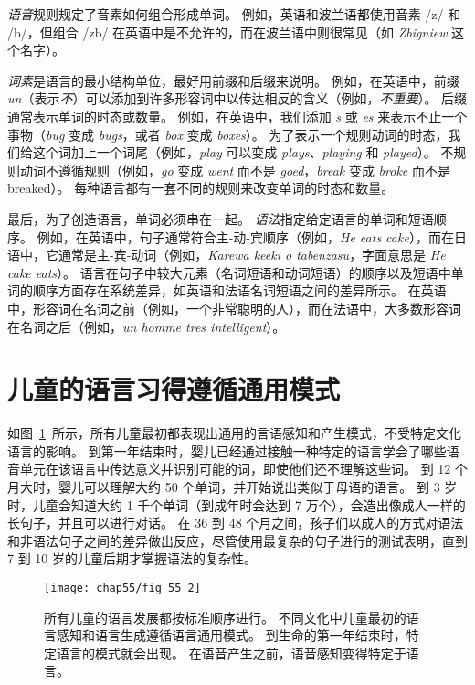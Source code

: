 \textit{语音}规则规定了音素如何组合形成单词。
例如，英语和波兰语都使用音素 /z/ 和 /b/，但组合 /zb/ 在英语中是不允许的，而在波兰语中则很常见（如 \textit{Zbigniew} 这个名字）。


\textit{词素}是语言的最小结构单位，最好用前缀和后缀来说明。
例如，在英语中，前缀 \textit{un}（表示\textit{不}）可以添加到许多形容词中以传达相反的含义（例如，\textit{不重要}）。
后缀通常表示单词的时态或数量。
例如，在英语中，我们添加 \textit{s} 或 \textit{es} 来表示不止一个事物（\textit{bug} 变成 \textit{bugs}，或者 \textit{box} 变成 \textit{boxes}）。
为了表示一个规则动词的时态，我们给这个词加上一个词尾（例如，\textit{play} 可以变成 \textit{plays}、\textit{playing} 和 \textit{played}）。
不规则动词不遵循规则（例如，\textit{go} 变成 \textit{went} 而不是 \textit{goed}，\textit{break} 变成 \textit{broke} 而不是 breaked）。
每种语言都有一套不同的规则来改变单词的时态和数量。


最后，为了创造语言，单词必须串在一起。
\textit{语法}指定给定语言的单词和短语顺序。
例如，在英语中，句子通常符合主-动-宾顺序（例如，\textit{He eats cake}），而在日语中，它通常是主-宾-动词（例如，\textit{Karewa keeki o tabenzasu}，字面意思是 \textit{He cake eats}）。
语言在句子中较大元素（名词短语和动词短语）的顺序以及短语中单词的顺序方面存在系统差异，如英语和法语名词短语之间的差异所示。
在英语中，形容词在名词之前（例如，一个非常聪明的人），而在法语中，大多数形容词在名词之后（例如，\textit{un homme tres intelligent}）。



\section{儿童的语言习得遵循通用模式}

如图~\ref{fig:55_2}~所示，所有儿童最初都表现出通用的言语感知和产生模式，不受特定文化语言的影响。
到第一年结束时，婴儿已经通过接触一种特定的语言学会了哪些语音单元在该语言中传达意义并识别可能的词，即使他们还不理解这些词。
到 12 个月大时，婴儿可以理解大约 50 个单词，并开始说出类似于母语的语言。
到 3 岁时，儿童会知道大约 1 千个单词（到成年时会达到 7 万个），会造出像成人一样的长句子，并且可以进行对话。
在 36 到 48 个月之间，孩子们以成人的方式对语法和非语法句子之间的差异做出反应，尽管使用最复杂的句子进行的测试表明，直到 7 到 10 岁的儿童后期才掌握语法的复杂性。


\begin{figure}[htbp]
	\centering
	\texttt{[image: chap55/fig\_55\_2]}
	\caption{所有儿童的语言发展都按标准顺序进行。
		不同文化中儿童最初的语言感知和语言生成遵循语言通用模式。
		到生命的第一年结束时，特定语言的模式就会出现。
		在语音产生之前，语音感知变得特定于语言\cite{doupe1999birdsong}。
	}
	\label{fig:55_2}
\end{figure}


